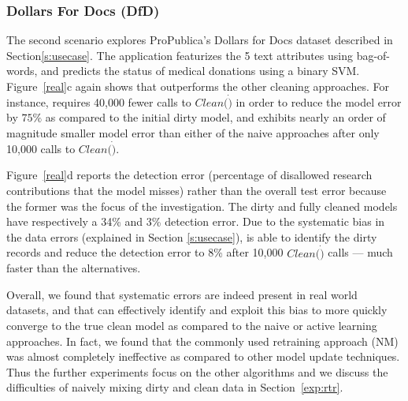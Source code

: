 \subsubsection{Dollars For Docs (DfD)}\label{exp:dfd}
The second scenario explores ProPublica's Dollars for Docs dataset described in Section\ref{s:usecase}.
The application featurizes the 5 text attributes using bag-of-words, and predicts the status of medical donations using a binary SVM.
Figure~\ref{real}c again shows that \sys outperforms the other cleaning approaches.
For instance, \sys requires 40,000 fewer calls to $Clean(\dot)$ in order to reduce the model error by $75\%$ as compared to the initial dirty model,
and exhibits nearly an order of magnitude smaller model error than either of the naive approaches after only 10,000 calls to $Clean(\dot)$.

Figure~\ref{real}d reports the detection error (percentage of disallowed research contributions that the model misses) rather than the overall test error because the former was the focus of the investigation.  The dirty and fully cleaned models have respectively a 34\% and 3\% detection error.
Due to the systematic bias in the data errors (explained in Section \ref{s:usecase}), \sys is able to identify the dirty records and
reduce the detection error to 8\% after 10,000 $Clean(\dot)$ calls --- much faster than the alternatives.

Overall, we found that systematic errors are indeed present in real world datasets, and that \sys can effectively identify and exploit this bias
to more quickly converge to the true clean model as compared to the naive or active learning approaches.  
In fact, we found that the commonly used retraining approach (NM) was almost completely ineffective as compared to other model update techniques.
Thus the further experiments focus on the other algorithms and we discuss the difficulties of naively mixing dirty and clean data in Section~\ref{exp:rtr}.


